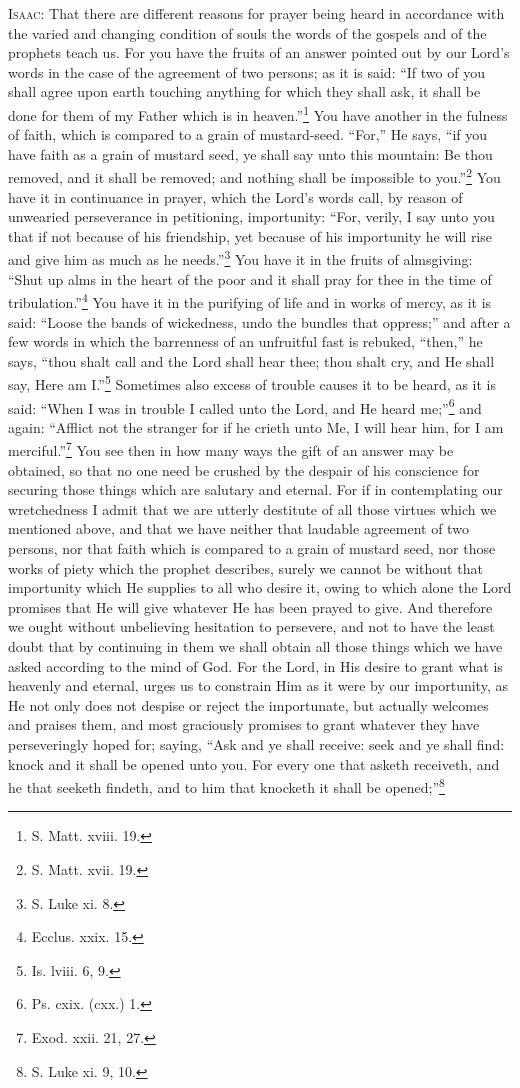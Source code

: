 \textsc{Isaac}: That there are different reasons for prayer being heard in accordance with the varied and changing condition of souls the words of the gospels and of the prophets teach us. For you have the fruits of an answer pointed out by our Lord’s words in the case of the agreement of two persons; as it is said: “If two of you shall agree upon earth touching anything for which they shall ask, it shall be done for them of my Father which is in heaven.”\footnote{S. Matt. xviii. 19.} You have another in the fulness of faith, which is compared to a grain of mustard-seed. “For,” He says, “if you have faith as a grain of mustard seed, ye shall say unto this mountain: Be thou removed, and it shall be removed; and nothing shall be impossible to you.”\footnote{S. Matt. xvii. 19.} You have it in continuance in prayer, which the Lord’s words call, by reason of unwearied perseverance in petitioning, importunity: “For, verily, I say unto you that if not because of his friendship, yet because of his importunity he will rise and give him as much as he needs.”\footnote{S. Luke xi. 8.} You have it in the fruits of almsgiving: “Shut up alms in the heart of the poor and it shall pray for thee in the time of tribulation.”\footnote{Ecclus. xxix. 15.} You have it in the purifying of life and in works of mercy, as it is said: “Loose the bands of wickedness, undo the bundles that oppress;” and after a few words in which the barrenness of an unfruitful fast is rebuked, “then,” he says, “thou shalt call and the Lord shall hear thee; thou shalt cry, and He shall say, Here am I.”\footnote{Is. lviii. 6, 9.} Sometimes also excess of trouble causes it to be heard, as it is said: “When I was in trouble I called unto the Lord, and He heard me;”\footnote{Ps. cxix. (cxx.) 1.} and again: “Afflict not the stranger for if he crieth unto Me, I will hear him, for I am merciful.”\footnote{Exod. xxii. 21, 27.} You see then in how many ways the gift of an answer may be obtained, so that no one need be crushed by the despair of his conscience for securing those things which are salutary and eternal. For if in contemplating our wretchedness I admit that we are utterly destitute of all those virtues which we mentioned above, and that we have neither that laudable agreement of two persons, nor that faith which is compared to a grain of mustard seed, nor those works of piety which the prophet describes, surely we cannot be without that importunity which He supplies to all who desire it, owing to which alone the Lord promises that He will give whatever He has been prayed to give. And therefore we ought without unbelieving hesitation to persevere, and not to have the least doubt that by continuing in them we shall obtain all those things which we have asked according to the mind of God. For the Lord, in His desire to grant what is heavenly and eternal, urges us to constrain Him as it were by our importunity, as He not only does not despise or reject the importunate, but actually welcomes and praises them, and most graciously promises to grant whatever they have perseveringly hoped for; saying, “Ask and ye shall receive: seek and ye shall find: knock and it shall be opened unto you. For every one that asketh receiveth, and he that seeketh findeth, and to him that knocketh it shall be opened;”\footnote{S. Luke xi. 9, 10.} 